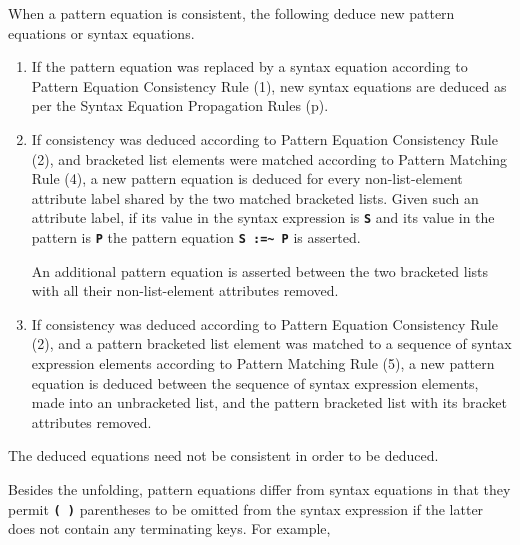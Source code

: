 \documentclass[12pt]{article}
\newcommand{\TT}[1]{{\tt \bfseries #1}}
\newcommand{\key}[1]{{\rm \bfseries #1}}
\newcommand{\pagref}[1]{p\pageref{#1}}
\newcommand{\TILDE}{\textasciitilde}
\newenvironment{indpar}[1][0.3in]%
	{\begin{list}{}%
		     {\setlength{\itemsep}{0in}%
		      \setlength{\topsep}{0in}%
		      \setlength{\parsep}{1ex}%
		      \setlength{\labelwidth}{#1}%
		      \setlength{\leftmargin}{#1}%
		      \addtolength{\leftmargin}{\labelsep}}%
	 \item}%
	{\end{list}}
\begin{document}
\begin{indpar}
\begin{list}{}{}
\item[\key{Pattern Equation Propagation Rules}%
           :]%
	   \label{PATTERN-EQUATION-PROPAGATION-RULES}
When a pattern equation is consistent, the following
deduce new pattern equations or syntax equations.

\begin{enumerate}

\item
If the pattern equation was replaced by a syntax equation according to
Pattern Equation Consistency Rule (1), new syntax equations are deduced
as per the Syntax Equation Propagation Rules
(\pagref{SYNTAX-EQUATION-PROPAGATION-RULES}).

\item
If consistency was deduced according to Pattern Equation Consistency Rule (2),
and bracketed list elements were matched according to Pattern Matching Rule (4),
a new pattern equation is deduced for every non-list-element
attribute label shared by the two matched bracketed lists.
Given such an attribute label, if its value in the syntax expression is
\TT{S} and its value in the pattern is \TT{P} the pattern equation
\TT{S :=\TILDE{} P} is asserted.

\medskip

An additional pattern equation is asserted between the two bracketed lists
with all their non-list-element attributes removed.


\item
If consistency was deduced according to Pattern Equation Consistency Rule (2),
and a pattern bracketed list element was matched to a sequence of
syntax expression elements according to Pattern Matching Rule (5),
a new pattern equation is deduced between the sequence of syntax expression
elements, made into an unbracketed list, and the pattern bracketed list
with its bracket attributes removed.

\end{enumerate}

The deduced equations need not be consistent in order to be deduced.
\end{list}
\end{indpar}

Besides the unfolding, pattern equations differ from syntax equations
in that they permit \TT{(~)} parentheses to be omitted from the
syntax expression if the latter does not contain any terminating keys.
For example,
\end{document}
